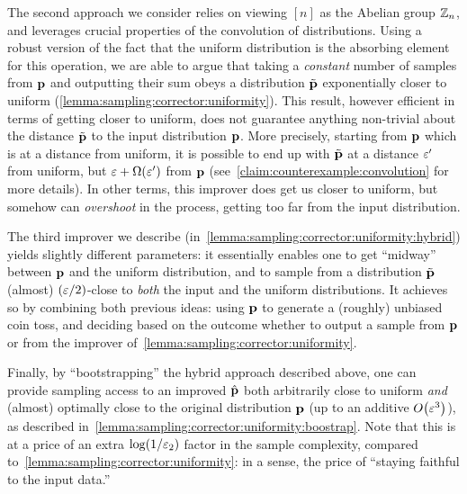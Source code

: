 The second approach we consider relies on viewing $[n]$ as the Abelian group $\mathbb{Z}_n$, 
and leverages crucial properties of the convolution of distributions. 
Using a robust version of the fact that the uniform distribution is the absorbing element for this operation, we are able to argue that taking a \emph{constant} number of samples from $\mathbf{p}$ and outputting their sum obeys a distribution $\tilde{\mathbf{p}}$ exponentially closer to uniform (\cref{lemma:sampling:corrector:uniformity}). This result, however efficient in terms of getting closer to uniform, does not guarantee anything non-trivial about the distance $\tilde{\mathbf{p}}$ to the input distribution $\mathbf{p}$. More precisely, starting from $\mathbf{p}$ which is at a distance \eps from uniform, it is possible to end up with $\tilde{\mathbf{p}}$ at a distance $\varepsilon^\prime$ from uniform, but $\eps+\bigOmega{\eps^\prime}$ from $\mathbf{p}$ (see~\cref{claim:counterexample:convolution} for more details). In other terms, this improver does get us closer to uniform, but somehow can \emph{overshoot} in the process, getting too far from the input distribution.

The third improver we describe (in~\cref{lemma:sampling:corrector:uniformity:hybrid}) yields slightly different parameters: it essentially enables one to get ``midway'' between $\mathbf{p}$ and the uniform distribution, and to sample from a distribution $\tilde{\mathbf{p}}$ (almost) $(\varepsilon/2)$-close to \emph{both} the input and the uniform distributions. It achieves so by combining both previous ideas: using $\mathbf{p}$ to generate a (roughly) unbiased coin toss, and deciding based on the outcome whether to output a sample from $\mathbf{p}$ or from the improver of~\cref{lemma:sampling:corrector:uniformity}.

Finally, by ``bootstrapping'' the hybrid approach described above, one can provide sampling access to an improved $\hat{\mathbf{p}}$ both arbitrarily close to uniform \emph{and} (almost) optimally close to the original distribution $\mathbf{p}$ (up to an additive $\bigO{\eps^3}$), as described in~\cref{lemma:sampling:corrector:uniformity:boostrap}. Note that this is at a price of an extra $\log(1/\varepsilon_2)$ factor in the sample complexity, compared to~\cref{lemma:sampling:corrector:uniformity}: in a sense, the price of ``staying faithful to the input data.''


